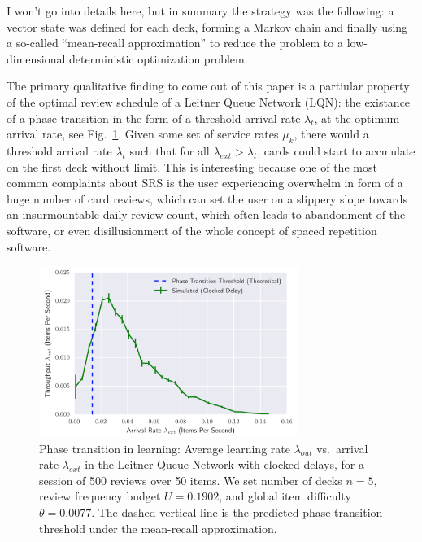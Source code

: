 I won't go into details here, but in summary the strategy was the
following: a vector state was defined for each deck, forming a Markov
chain and finally using a so-called ``mean-recall approximation'' to
reduce the problem to a low-dimensional deterministic optimization
problem.

The primary qualitative finding to come out of this paper is a partiular
property of the optimal review schedule of a Leitner Queue Network
(LQN): the existance of a phase transition in the form of a threshold
arrival rate \(\lambda_{t}\), at the optimum arrival rate, see
Fig.~\ref{fig:phase-transition}. Given some set of service rates
\(\mu_k\), there would a threshold arrival rate \(\lambda_t\) such that
for all \(\lambda_{ext} > \lambda_t\), cards could start to accmulate on
the first deck without limit. This is interesting because one of the
most common complaints about SRS is the user experiencing overwhelm in
form of a huge number of card reviews, which can set the user on a
slippery slope towards an insurmountable daily review count, which often
leads to abandonment of the software, or even disillusionment of the
whole concept of spaced repetition software.

\begin{figure}
\centering
\includegraphics[width=0.75000\textwidth]{assets/phase-transition.png}
\caption[Phase transition in learning: Average learning rate
\(\lambda_{out}\) vs.~arrival rate \(\lambda_{ext}\) in the Leitner
Queue Network with clocked delays, for a session of 500 reviews over 50
items. We set number of decks \(n = 5\), review frequency budget
\(U = 0.1902\), and global item difficulty \(\theta = 0.0077\). The
dashed vertical line is the predicted phase transition threshold under
the mean-recall approximation.]{Phase transition in learning: Average
learning rate \(\lambda_{out}\) vs.~arrival rate \(\lambda_{ext}\) in
the Leitner Queue Network with clocked delays, for a session of 500
reviews over 50 items. We set number of decks \(n = 5\), review
frequency budget \(U = 0.1902\), and global item difficulty
\(\theta = 0.0077\). The dashed vertical line is the predicted phase
transition threshold under the mean-recall
approximation.\footnotemark{}}\label{fig:phase-transition}
\end{figure}

